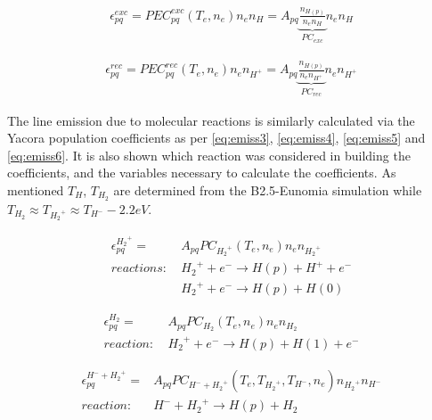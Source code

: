 \begin{equation}
\label{eq:emiss1}
\begin{aligned}
\epsilon^{exc}_{pq} = PEC^{exc}_{pq}(T_e,n_e) n_e n_{H} = A_{pq} \underbrace{ \frac{n_{H(p)}}{n_e n_{H}}}_{PC_{exc}} n_e n_{H} 
\end{aligned}
\end{equation}

\begin{equation}
\label{eq:emiss2}
\begin{aligned}
\epsilon^{rec}_{pq} = PEC^{rec}_{pq}(T_e,n_e) n_e n_{H^+{}} = A_{pq} \underbrace{\frac{n_{H(p)}}{n_e n_{H^+{}}}}_{PC_{rec}} n_e n_{H^+{}}
\end{aligned}
\end{equation}

The line emission due to molecular reactions is similarly calculated via the Yacora population coefficients as per \autoref{eq:emiss3}, \ref{eq:emiss4}, \ref{eq:emiss5} and \ref{eq:emiss6}. It is also shown which reaction was considered in building the coefficients, and the variables necessary to calculate the coefficients. As mentioned $T_H$, $T_{H_2}$ are determined from the B2.5-Eunomia simulation while $T_{H_2} \approx T_{{H_2}^+} \approx T_{H^-}-2.2eV$.

\begin{equation}
\label{eq:emiss3}
\begin{aligned}
\epsilon^{{H_2}^+{}}_{pq} =& A_{pq} PC_{{H_2}^+{}}(T_e,n_e) n_e n_{{H_2}^+{}} \\
reactions:\ &{H_2}^+{} + e^-{} \rightarrow H(p) + H^+{} + e^-{} \\ 
\ &{H_2}^+{} + e^-{} \rightarrow H(p) + H(0)
\end{aligned}
\end{equation}

\begin{equation}
\label{eq:emiss4}
\begin{aligned}
\epsilon^{{H_2}}_{pq} =& A_{pq} PC_{{H_2}}(T_e,n_e) n_e n_{{H_2}} \\
reaction:\ &{H_2}^+{} + e^-{} \rightarrow H(p) + H(1) + e^-{}
\end{aligned}
\end{equation}

\begin{equation}
\label{eq:emiss5}
\begin{aligned}
\epsilon^{{H}^-{}+{H_2}^+{}}_{pq} =& A_{pq} PC_{{H}^-{}+{H_2}^+{}}(T_e,T_{{H_2}^+{}},T_{{H}^-{}},n_e) n_{{H_2}^+{}} n_{{H}^-{}} \\
reaction:\ &{H}^-{}+{H_2}^+{} \rightarrow H(p) + H_2
\end{aligned}
\end{equation}


